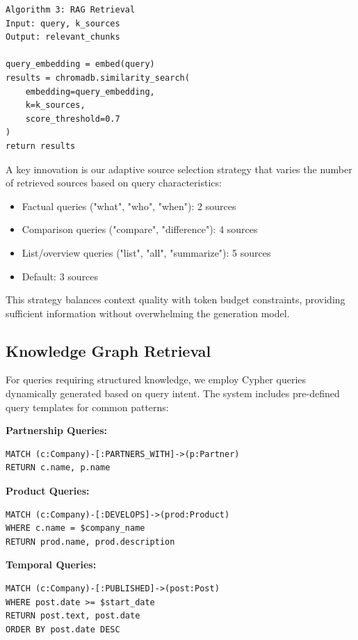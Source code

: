 \documentclass[11pt,twocolumn]{article}
\begin{document}
\begin{verbatim}
Algorithm 3: RAG Retrieval
Input: query, k_sources
Output: relevant_chunks

query_embedding = embed(query)
results = chromadb.similarity_search(
    embedding=query_embedding,
    k=k_sources,
    score_threshold=0.7
)
return results
\end{verbatim}

A key innovation is our adaptive source selection strategy that varies the number of retrieved sources based on query characteristics:

\begin{itemize}
\item Factual queries ("what", "who", "when"): 2 sources
\item Comparison queries ("compare", "difference"): 4 sources
\item List/overview queries ("list", "all", "summarize"): 5 sources
\item Default: 3 sources
\end{itemize}

This strategy balances context quality with token budget constraints, providing sufficient information without overwhelming the generation model.

\subsection{Knowledge Graph Retrieval}

For queries requiring structured knowledge, we employ Cypher queries dynamically generated based on query intent. The system includes pre-defined query templates for common patterns:

\textbf{Partnership Queries:}
\begin{verbatim}
MATCH (c:Company)-[:PARTNERS_WITH]->(p:Partner)
RETURN c.name, p.name
\end{verbatim}

\textbf{Product Queries:}
\begin{verbatim}
MATCH (c:Company)-[:DEVELOPS]->(prod:Product)
WHERE c.name = $company_name
RETURN prod.name, prod.description
\end{verbatim}

\textbf{Temporal Queries:}
\begin{verbatim}
MATCH (c:Company)-[:PUBLISHED]->(post:Post)
WHERE post.date >= $start_date
RETURN post.text, post.date
ORDER BY post.date DESC
\end{verbatim}
\end{document}
